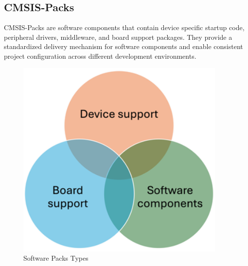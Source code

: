 \subsection{CMSIS-Packs} CMSIS-Packs are software components that contain device specific startup code, peripheral drivers, middleware, and board support packages. They provide a standardized delivery mechanism for software components and enable consistent project configuration across different development environments.
\begin{figure}[H]
	\centering
	\includegraphics[height=10cm]{img/ST_Summer_Internship/pack_trinity.png}
	\caption{Software Packs Types}
	\label{fig:sw_trinity}
\end{figure}
